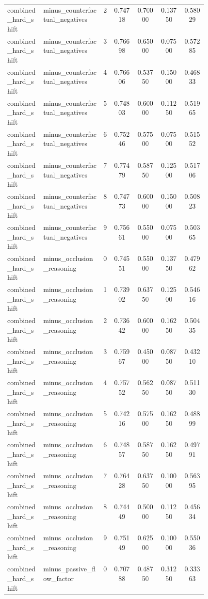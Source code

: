 \documentclass{article}
\begin{document}
\begin{center}
\begin{longtable}{p{0.18\linewidth}p{0.30\linewidth}ccccc}
combined\_hard\_shift & minus\_counterfactual\_negatives & 2 & 0.74718 & 0.70000 & 0.13750 & 0.58029\\
combined\_hard\_shift & minus\_counterfactual\_negatives & 3 & 0.76698 & 0.65000 & 0.07500 & 0.57285\\
combined\_hard\_shift & minus\_counterfactual\_negatives & 4 & 0.76606 & 0.53750 & 0.15000 & 0.46833\\
combined\_hard\_shift & minus\_counterfactual\_negatives & 5 & 0.74803 & 0.60000 & 0.11250 & 0.51965\\
combined\_hard\_shift & minus\_counterfactual\_negatives & 6 & 0.75246 & 0.57500 & 0.07500 & 0.51552\\
combined\_hard\_shift & minus\_counterfactual\_negatives & 7 & 0.77479 & 0.58750 & 0.12500 & 0.51706\\
combined\_hard\_shift & minus\_counterfactual\_negatives & 8 & 0.74773 & 0.60000 & 0.15000 & 0.50823\\
combined\_hard\_shift & minus\_counterfactual\_negatives & 9 & 0.75661 & 0.55000 & 0.07500 & 0.50365\\
combined\_hard\_shift & minus\_occlusion\_reasoning & 0 & 0.74551 & 0.55000 & 0.13750 & 0.47962\\
combined\_hard\_shift & minus\_occlusion\_reasoning & 1 & 0.73902 & 0.63750 & 0.12500 & 0.54616\\
combined\_hard\_shift & minus\_occlusion\_reasoning & 2 & 0.73642 & 0.60000 & 0.16250 & 0.50435\\
combined\_hard\_shift & minus\_occlusion\_reasoning & 3 & 0.75967 & 0.45000 & 0.08750 & 0.43210\\
combined\_hard\_shift & minus\_occlusion\_reasoning & 4 & 0.75752 & 0.56250 & 0.08750 & 0.51130\\
combined\_hard\_shift & minus\_occlusion\_reasoning & 5 & 0.74216 & 0.57500 & 0.16250 & 0.48899\\
combined\_hard\_shift & minus\_occlusion\_reasoning & 6 & 0.74857 & 0.58750 & 0.16250 & 0.49791\\
combined\_hard\_shift & minus\_occlusion\_reasoning & 7 & 0.76428 & 0.63750 & 0.10000 & 0.56395\\
combined\_hard\_shift & minus\_occlusion\_reasoning & 8 & 0.74449 & 0.50000 & 0.11250 & 0.45634\\
combined\_hard\_shift & minus\_occlusion\_reasoning & 9 & 0.75149 & 0.62500 & 0.10000 & 0.55036\\
combined\_hard\_shift & minus\_passive\_flow\_factor & 0 & 0.70788 & 0.48750 & 0.31250 & 0.33363\\

\end{longtable}
\end{center}
\end{document}
